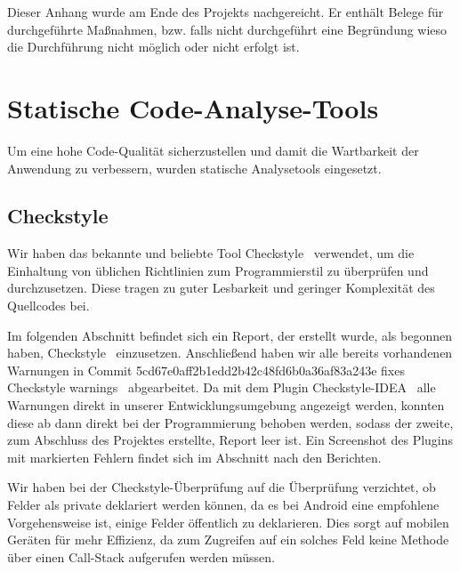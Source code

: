 
    Dieser Anhang wurde am Ende des Projekts nachgereicht. Er enthält Belege für
    durchgeführte Maßnahmen, bzw. falls nicht durchgeführt eine Begründung wieso
    die Durchführung nicht möglich oder nicht erfolgt ist. \\



\section{Statische Code-Analyse-Tools}

Um eine hohe Code-Qualität sicherzustellen und damit die Wartbarkeit der
Anwendung zu verbessern, wurden statische Analysetools eingesetzt.

\subsection{Checkstyle}

Wir haben das bekannte und beliebte Tool \glqq Checkstyle\grqq~ verwendet, um die Einhaltung von üblichen Richtlinien zum Programmierstil zu überprüfen und durchzusetzen. Diese tragen zu guter Lesbarkeit und geringer Komplexität des Quellcodes bei.

Im folgenden Abschnitt befindet sich ein Report, der erstellt wurde, als begonnen haben, \glqq Checkstyle\grqq~ einzusetzen. Anschließend haben wir alle bereits vorhandenen Warnungen in Commit 5cd67e0aff2b1edd2b42c48fd6b0a36af83a243e \glqq fixes Checkstyle warnings\grqq~ abgearbeitet. Da mit dem Plugin \glqq Checkstyle-IDEA\grqq~ alle Warnungen direkt in unserer Entwicklungsumgebung angezeigt werden, konnten diese ab dann direkt bei der Programmierung behoben werden, sodass der zweite, zum Abschluss des Projektes erstellte, Report leer ist. Ein Screenshot des Plugins mit markierten Fehlern findet sich im Abschnitt nach den Berichten.

Wir haben bei der Checkstyle-Überprüfung auf die Überprüfung verzichtet, ob Felder als private deklariert werden können, da es bei Android eine empfohlene Vorgehensweise ist, einige Felder öffentlich zu deklarieren. Dies sorgt auf mobilen Geräten für mehr Effizienz, da zum Zugreifen auf ein solches Feld keine Methode über einen Call-Stack aufgerufen werden müssen.





